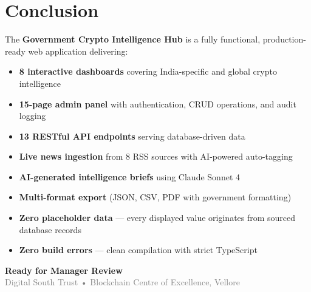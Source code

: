 \documentclass[12pt,a4paper]{article}
\begin{document}
\newpage

\section{Conclusion}

The \textbf{Government Crypto Intelligence Hub} is a fully functional, production-ready web application delivering:

\begin{itemize}[nosep]
    \item \textbf{8 interactive dashboards} covering India-specific and global crypto intelligence
    \item \textbf{15-page admin panel} with authentication, CRUD operations, and audit logging
    \item \textbf{13 RESTful API endpoints} serving database-driven data
    \item \textbf{Live news ingestion} from 8 RSS sources with AI-powered auto-tagging
    \item \textbf{AI-generated intelligence briefs} using Claude Sonnet 4
    \item \textbf{Multi-format export} (JSON, CSV, PDF with government formatting)
    \item \textbf{Zero placeholder data} — every displayed value originates from sourced database records
    \item \textbf{Zero build errors} — clean compilation with strict TypeScript
\end{itemize}

\vspace{1em}

\begin{center}
\large\textbf{Ready for Manager Review}\\[0.5em]
\normalsize\textcolor{graytext}{Digital South Trust • Blockchain Centre of Excellence, Vellore}
\end{center}
\end{document}
